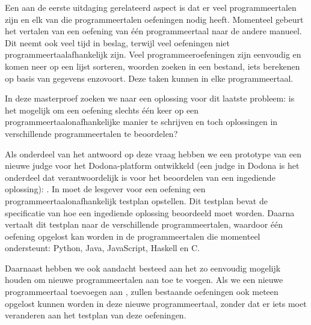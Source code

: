 Een aan de eerste uitdaging gerelateerd aspect is dat er veel programmeertalen zijn en elk van die programmeertalen oefeningen nodig heeft.
Momenteel gebeurt het vertalen van een oefening van één programmeertaal naar de andere manueel.
Dit neemt ook veel tijd in beslag, terwijl veel oefeningen niet programmeertaalafhankelijk zijn.
Veel programmeeroefeningen zijn eenvoudig en komen neer op een lijst sorteren, woorden zoeken in een bestand, iets berekenen op basis van gegevens enzovoort.
Deze taken kunnen in elke programmeertaal.

In deze masterproef zoeken we naar een oplossing voor dit laatste probleem: is het mogelijk om een oefening slechts één keer op een programmeertaalonafhankelijke manier te schrijven en toch oplossingen in verschillende programmeertalen te beoordelen?

Als onderdeel van het antwoord op deze vraag hebben we een prototype van een nieuwe judge voor het Dodona-platform ontwikkeld (een judge in Dodona is het onderdeel dat verantwoordelijk is voor het beoordelen van een ingediende oplossing): \tested{}.
In \tested{} moet de lesgever voor een oefening een programmeertaalonafhankelijk testplan opstellen.
Dit testplan bevat de specificatie van hoe een ingediende oplossing beoordeeld moet worden.
Daarna vertaalt \tested{} dit testplan naar de verschillende programmeertalen, waardoor één oefening opgelost kan worden in de programmeertalen die \tested{} momenteel ondersteunt: Python, Java, JavaScript, Haskell en C.\@

Daarnaast hebben we ook aandacht besteed aan het zo eenvoudig mogelijk houden om nieuwe programmeertalen aan \tested{} toe te voegen.
Als we een nieuwe programmeertaal toevoegen aan \tested{}, zullen bestaande oefeningen ook meteen opgelost kunnen worden in deze nieuwe programmeertaal, zonder dat er iets moet veranderen aan het testplan van deze oefeningen.
